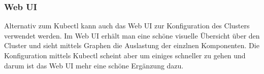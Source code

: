 \subsubsection{Web UI}
Alternativ zum Kubectl kann auch das Web UI zur Konfiguration des Clusters verwendet werden. Im Web UI erhält man eine schöne visuelle Übersicht über den Cluster und sieht mittels Graphen die Auslastung der einzlnen Komponenten. Die Konfiguration mittels Kubectl scheint aber um einiges schneller zu gehen und darum ist das Web UI mehr eine schöne Ergänzung dazu. \cite{kubernetes}
\clearpage